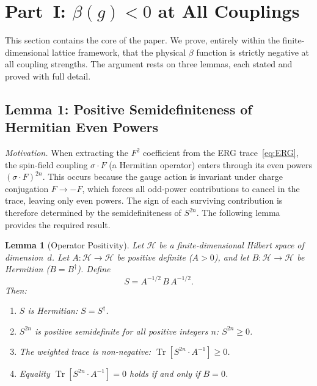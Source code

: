 \documentclass[12pt,a4paper]{article}
\theoremstyle{plain}
\newtheorem{lemma}[theorem]{Lemma}
\theoremstyle{definition}
\theoremstyle{remark}
\begin{document}
\section{Part~I: $\beta(g)<0$ at All Couplings}\label{sec:betaneg}

This section contains the core of the paper. We prove, entirely within the finite-dimensional lattice framework, that the physical $\beta$ function is strictly negative at all coupling strengths. The argument rests on three lemmas, each stated and proved with full detail.

\subsection{Lemma 1: Positive Semidefiniteness of Hermitian Even Powers}\label{sec:lemma1}

\textit{Motivation.} When extracting the $F^2$ coefficient from the ERG trace~\eqref{eq:ERG}, the spin-field coupling $\sigma\cdot F$ (a Hermitian operator) enters through its even powers $(\sigma\cdot F)^{2n}$. This occurs because the gauge action is invariant under charge conjugation $F\to-F$, which forces all odd-power contributions to cancel in the trace, leaving only even powers. The sign of each surviving contribution is therefore determined by the semidefiniteness of $S^{2n}$. The following lemma provides the required result.

\begin{lemma}[Operator Positivity]\label{lem:op}
Let $\mathcal{H}$ be a finite-dimensional Hilbert space of dimension~$d$. Let $A:\mathcal{H}\to\mathcal{H}$ be positive definite ($A>0$), and let $B:\mathcal{H}\to\mathcal{H}$ be Hermitian ($B=B^\dagger$). Define
\begin{equation}\label{eq:Sdef}
S = A^{-1/2}\,B\,A^{-1/2}.
\end{equation}
Then:
\begin{enumerate}[label=(\alph*)]
\item $S$ is Hermitian: $S=S^\dagger$.
\item $S^{2n}$ is positive semidefinite for all positive integers $n$: $S^{2n}\geq 0$.
\item The weighted trace is non-negative: $\operatorname{Tr}[S^{2n}\cdot A^{-1}]\geq 0$.
\item Equality $\operatorname{Tr}[S^{2n}\cdot A^{-1}]=0$ holds if and only if $B=0$.
\end{enumerate}
\end{lemma}
\end{document}
